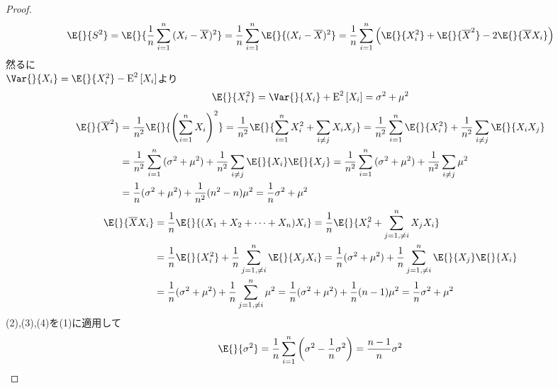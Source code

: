             \begin{proof}
            {%
                \newcommand{\EE}[1]{\text{E}^2\left[#1\right]}
                \renewcommand{\s}{\sigma^2}
                \newcommand{\mX}{\overline{X}}
                \begin{equation}
                    \E{}{S^2} = \E{}{\frac{1}{n}\sum_{i=1}^{n}{(X_i-\mX)^2}} = \frac{1}{n}\sum_{i=1}^{n}{\E{}{(X_i-\mX)^2}} = \frac{1}{n}\sum_{i=1}^{n}{\left(\E{}{X_i^2}+\E{}{\mX^2}-2\E{}{\mX X_i}\right)}
                \end{equation}
                然るに\\
                $\Var{}{X_i} = \E{}{X_i^2}-\EE{X_i}$より
                \begin{equation}
                    \E{}{X_i^2} = \Var{}{X_i}+\EE{X_i} = \s+\mu^2
                \end{equation}
                \begin{align}
                    \E{}{\mX^2} &= \frac{1}{n^2}\E{}{\left(\sum_{i=1}^{n}{X_i}\right)^2} = \frac{1}{n^2}\E{}{\sum_{i=1}^{n}{X_i^2} + \sum_{i\neq j}^{}{X_iX_j}} = \frac{1}{n^2}\sum_{i=1}^{n}{\E{}{X_i^2}} + \frac{1}{n^2}\sum_{i\neq j}^{}{\E{}{X_iX_j}} \nonumber \\
                    &= \frac{1}{n^2}\sum_{i=1}^{n}{(\s+\mu^2)} + \frac{1}{n^2}\sum_{i\neq j}^{}{\E{}{X_i}\E{}{X_j}} = \frac{1}{n^2}\sum_{i=1}^{n}{(\s+\mu^2)} + \frac{1}{n^2}\sum_{i\neq j}^{}{\mu^2} \nonumber \\
                    &= \frac{1}{n}(\s+\mu^2) + \frac{1}{n^2}(n^2-n)\mu^2 = \frac{1}{n}\s + \mu^2
                \end{align}
                \begin{align}
                    \E{}{\mX X_i} &= \frac{1}{n}\E{}{(X_1+X_2+\dotsb+X_n)X_i} = \frac{1}{n}\E{}{X_i^2 + \sum_{j=1,\neq i}^{n}{X_jX_i}} \nonumber \\
                    &= \frac{1}{n}\E{}{X_i^2} + \frac{1}{n}\sum_{j=1,\neq i}^{n}{\E{}{X_jX_i}} = \frac{1}{n}(\s+\mu^2) + \frac{1}{n}\sum_{j=1,\neq i}^{n}{\E{}{X_j}\E{}{X_i}} \nonumber \\
                    &= \frac{1}{n}(\s+\mu^2) + \frac{1}{n}\sum_{j=1,\neq i}^{n}{\mu^2} = \frac{1}{n}(\s+\mu^2) + \frac{1}{n}(n-1)\mu^2 = \frac{1}{n}\s + \mu^2
                \end{align}
                (2),(3),(4)を(1)に適用して
                \[\E{}{\s} = \frac{1}{n}\sum_{i=1}^{n}{\left(\s-\frac{1}{n}\s\right)} = \frac{n-1}{n}\s\]
            }
            \end{proof}